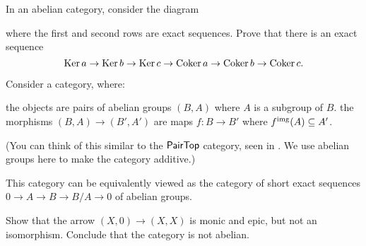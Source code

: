 \begin{sproblem}
	\gim
	In an abelian category, consider the diagram
	\begin{center}
	\end{center}
	where the first and second rows are exact sequences.
	Prove that there is an exact sequence
	\[ \operatorname{Ker} a \to \operatorname{Ker} b \to \operatorname{Ker} c \to \operatorname{Coker} a \to \operatorname{Coker} b \to \operatorname{Coker} c. \]
\end{sproblem}

\begin{problem}
	Consider a category, where:
	\begin{itemize}
		\ii the objects are pairs of abelian groups $(B, A)$ where $A$ is a subgroup of $B$.
		\ii the morphisms $(B, A) \to (B', A')$ are maps $f \colon B \to B'$ where
		$f^{\text{img}}(A) \subseteq A'$.
	\end{itemize}
	(You can think of this similar to the $\mathsf{PairTop}$ category, seen in
	. We use abelian groups here to make the category additive.)

	This category can be equivalently viewed as the category of short exact sequences
	$0 \to A \to B \to B/A \to 0$ of abelian groups.

	Show that the arrow $(X, 0) \to (X, X)$ is monic and epic, but not an
	isomorphism. Conclude that the category is not abelian.
\end{problem}
